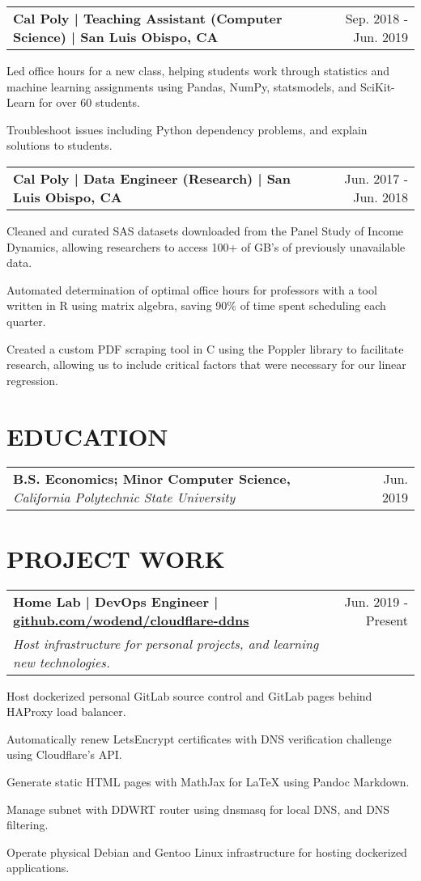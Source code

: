 \documentclass{article}
\makeatletter
\newcommand{\beginResumeList}{\begin{itemize}\setlength\itemsep{0em}\begin{minipage}{0.9\textwidth}}
\newcommand{\resumeListEnd}{\end{minipage}\end{itemize}}
\newcommand{\normalItem}[1]{\normalsize\item{#1}}
\newcommand{\experience}[2]{
  \begin{tabular*}{\textwidth}[t]{l@{\extracolsep{\fill}}r}
    \normalsize\textbf{#1} & \normalsize #2 \\
  \end{tabular*}
}
\newcommand{\education}[3]{
  \begin{tabular*}{\textwidth}[t]{l@{\extracolsep{\fill}}r}
    \normalsize\textbf{#1, }\textit{#2} & \normalsize #3 \\
  \end{tabular*}\vspace{-5pt}
}
\newcommand{\project}[3]{
  \begin{tabular*}{\textwidth}[t]{l@{\extracolsep{\fill}}r}
    \normalsize\textbf{#1} & \normalsize #2 \\
    \normalsize\textit{#3}
  \end{tabular*}
}
\makeatother
\begin{document}
  \experience
    {Cal Poly | Teaching Assistant (Computer Science) | San Luis Obispo, CA}
    {Sep. 2018 - Jun. 2019}
    \beginResumeList
      \normalItem{Led office hours for a new class, helping students work through statistics and machine learning assignments using Pandas, NumPy, statsmodels, and SciKit-Learn for over 60 students.}
      \normalItem{Troubleshoot issues including Python dependency problems, and explain solutions to students.}
    \resumeListEnd

  \experience
    {Cal Poly | Data Engineer (Research) | San Luis Obispo, CA}
    {Jun. 2017 - Jun. 2018}
    \beginResumeList
      \normalItem{Cleaned and curated SAS datasets downloaded from the Panel Study of Income Dynamics, allowing researchers to access 100+ of GB's of previously unavailable data.}
      \normalItem{Automated determination of optimal office hours for professors with a tool written in R using matrix algebra, saving 90\% of time spent scheduling each quarter.}
      \normalItem{Created a custom PDF scraping tool in C using the Poppler library to facilitate research, allowing us to include critical factors that were necessary for our linear regression.}
    \resumeListEnd

\section{EDUCATION}
  \education
    {B.S. Economics; Minor Computer Science}
    {California Polytechnic State University}
    {Jun. 2019}

\section{PROJECT WORK}
  \project
    {Home Lab | DevOps Engineer | \href{https://github.com/wodend/cloudflare-ddns}{github.com/wodend/cloudflare-ddns}}
    {Jun. 2019 - Present}
    {Host infrastructure for personal projects, and learning new technologies.}
    \beginResumeList
      \normalItem{Host dockerized personal GitLab source control and GitLab pages behind HAProxy load balancer.}
      \normalItem{Automatically renew LetsEncrypt certificates with DNS verification challenge using Cloudflare's API.}
      \normalItem{Generate static HTML pages with MathJax for LaTeX using Pandoc Markdown.}
      \normalItem{Manage subnet with DDWRT router using dnsmasq for local DNS, and DNS filtering.}
      \normalItem{Operate physical Debian and Gentoo Linux infrastructure for hosting dockerized applications.}
    \resumeListEnd
\end{document}
